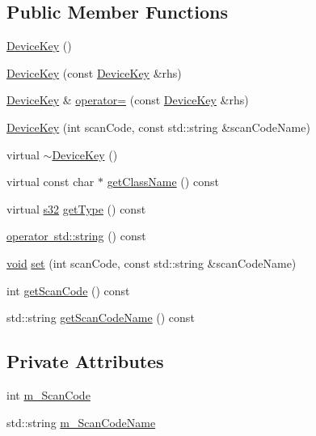 \subsection*{Public Member Functions}
\begin{DoxyCompactItemize}
\item 
\mbox{\hyperlink{classnjli_1_1_device_key_a6c0ce8411a06487b2d23b6d5a527aa25}{Device\+Key}} ()
\item 
\mbox{\hyperlink{classnjli_1_1_device_key_a97f655c0ede86cf0fe3806108517dbad}{Device\+Key}} (const \mbox{\hyperlink{classnjli_1_1_device_key}{Device\+Key}} \&rhs)
\item 
\mbox{\hyperlink{classnjli_1_1_device_key}{Device\+Key}} \& \mbox{\hyperlink{classnjli_1_1_device_key_a24bc97579381b1f0c3dadf46be045c27}{operator=}} (const \mbox{\hyperlink{classnjli_1_1_device_key}{Device\+Key}} \&rhs)
\item 
\mbox{\hyperlink{classnjli_1_1_device_key_ab7f6d643ded11dc722c507ce6171c58a}{Device\+Key}} (int scan\+Code, const std\+::string \&scan\+Code\+Name)
\item 
virtual \mbox{\hyperlink{classnjli_1_1_device_key_a06bc979d7804180fd4e383798ee308ab}{$\sim$\+Device\+Key}} ()
\item 
virtual const char $\ast$ \mbox{\hyperlink{classnjli_1_1_device_key_a14f6e0865bbf44c100b34448e9d67f24}{get\+Class\+Name}} () const
\item 
virtual \mbox{\hyperlink{_util_8h_aa62c75d314a0d1f37f79c4b73b2292e2}{s32}} \mbox{\hyperlink{classnjli_1_1_device_key_aa7b5696085bd6c8a1a935d422ae51e1f}{get\+Type}} () const
\item 
\mbox{\hyperlink{classnjli_1_1_device_key_a49edcb4af0e6bc5e9830e770c85437f1}{operator std\+::string}} () const
\item 
\mbox{\hyperlink{_thread_8h_af1e856da2e658414cb2456cb6f7ebc66}{void}} \mbox{\hyperlink{classnjli_1_1_device_key_a9bf8e7ef5d2038aefc61d8732ee1169a}{set}} (int scan\+Code, const std\+::string \&scan\+Code\+Name)
\item 
int \mbox{\hyperlink{classnjli_1_1_device_key_ab75e19e17395f72ec633f491ad502784}{get\+Scan\+Code}} () const
\item 
std\+::string \mbox{\hyperlink{classnjli_1_1_device_key_a1e9dfe1c89d373a70d12a81de08c29e3}{get\+Scan\+Code\+Name}} () const
\end{DoxyCompactItemize}
\subsection*{Private Attributes}
\begin{DoxyCompactItemize}
\item 
int \mbox{\hyperlink{classnjli_1_1_device_key_a326eb4f8f1b7abc2b916c8ed11d8dca6}{m\+\_\+\+Scan\+Code}}
\item 
std\+::string \mbox{\hyperlink{classnjli_1_1_device_key_ac619bfe3e166c9f9ddda4e308f4315d9}{m\+\_\+\+Scan\+Code\+Name}}
\end{DoxyCompactItemize}
